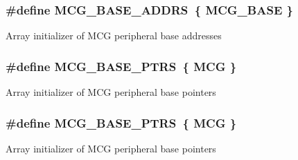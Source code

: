 \subsubsection[{\texorpdfstring{M\+C\+G\+\_\+\+B\+A\+S\+E\+\_\+\+A\+D\+D\+RS}{MCG_BASE_ADDRS}}]{\setlength{\rightskip}{0pt plus 5cm}\#define M\+C\+G\+\_\+\+B\+A\+S\+E\+\_\+\+A\+D\+D\+RS~\{ {\bf M\+C\+G\+\_\+\+B\+A\+SE} \}}\hypertarget{group__MCG__Peripheral__Access__Layer_gab7ba0907fd63f1e70dddac601e4f9dd9}{}\label{group__MCG__Peripheral__Access__Layer_gab7ba0907fd63f1e70dddac601e4f9dd9}
Array initializer of M\+CG peripheral base addresses 
\subsubsection[{\texorpdfstring{M\+C\+G\+\_\+\+B\+A\+S\+E\+\_\+\+P\+T\+RS}{MCG_BASE_PTRS}}]{\setlength{\rightskip}{0pt plus 5cm}\#define M\+C\+G\+\_\+\+B\+A\+S\+E\+\_\+\+P\+T\+RS~\{ {\bf M\+CG} \}}\hypertarget{group__MCG__Peripheral__Access__Layer_ga3e6aec328b7327acc1f7bff70bec388c}{}\label{group__MCG__Peripheral__Access__Layer_ga3e6aec328b7327acc1f7bff70bec388c}
Array initializer of M\+CG peripheral base pointers 
\subsubsection[{\texorpdfstring{M\+C\+G\+\_\+\+B\+A\+S\+E\+\_\+\+P\+T\+RS}{MCG_BASE_PTRS}}]{\setlength{\rightskip}{0pt plus 5cm}\#define M\+C\+G\+\_\+\+B\+A\+S\+E\+\_\+\+P\+T\+RS~\{ {\bf M\+CG} \}}\hypertarget{group__MCG__Peripheral__Access__Layer_ga3e6aec328b7327acc1f7bff70bec388c}{}\label{group__MCG__Peripheral__Access__Layer_ga3e6aec328b7327acc1f7bff70bec388c}
Array initializer of M\+CG peripheral base pointers 